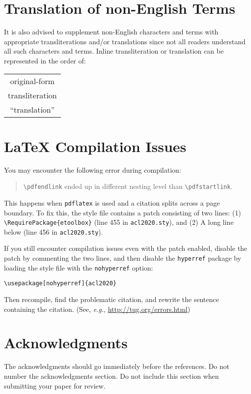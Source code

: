 \documentclass[11pt,a4paper]{article}
\begin{document}
\section{Translation of non-English Terms}

It is also advised to supplement non-English characters and terms with appropriate transliterations and/or translations since not all readers understand all such characters and terms.
Inline transliteration or translation can be represented in the order of:
\begin{center}
\begin{tabular}{c}
original-form \\
transliteration \\
``translation''
\end{tabular}
\end{center}

\section{\LaTeX{} Compilation Issues}
You may encounter the following error during compilation: 
\begin{quote}
{\small\verb|\pdfendlink|} ended up in different nesting level than {\small\verb|\pdfstartlink|}.
\end{quote}
This happens when \texttt{\small pdflatex} is used and a citation splits across a page boundary.
To fix this, the style file contains a patch consisting of two lines:
(1) {\small\verb|\RequirePackage{etoolbox}|} (line 455 in \texttt{\small acl2020.sty}), and
(2) A long line below (line 456 in \texttt{\small acl2020.sty}).

If you still encounter compilation issues even with the patch enabled, disable the patch by commenting the two lines, and then disable the \texttt{\small hyperref} package by loading the style file with the \texttt{\small nohyperref} option:

\noindent
{\small\verb|\usepackage[nohyperref]{acl2020}|}

\noindent
Then recompile, find the problematic citation, and rewrite the sentence containing the citation. (See, {\em e.g.}, \url{http://tug.org/errors.html})

\section*{Acknowledgments}

The acknowledgments should go immediately before the references. Do not number the acknowledgments section.
Do not include this section when submitting your paper for review.
\end{document}
